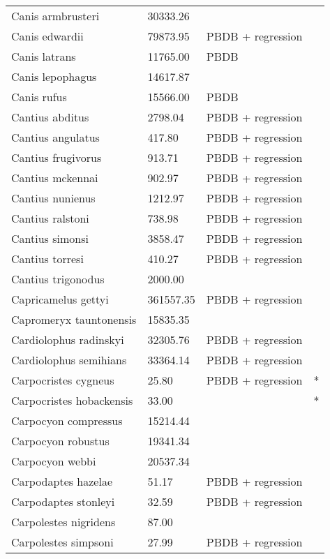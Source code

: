 \documentclass{article}
\begin{document}
\begin{center}
\begin{longtable}{p{} p{} p{} p{}}
    Canis armbrusteri & 30333.26 & \cite{Tomiya2013} &  \\ 
    Canis edwardii & 79873.95 & PBDB + regression &  \\ 
    Canis latrans & 11765.00 & PBDB &  \\ 
    Canis lepophagus & 14617.87 & \cite{Tomiya2013} &  \\ 
    Canis rufus & 15566.00 & PBDB &  \\ 
    Cantius abditus & 2798.04 & PBDB + regression &  \\ 
    Cantius angulatus & 417.80 & PBDB + regression &  \\ 
    Cantius frugivorus & 913.71 & PBDB + regression &  \\ 
    Cantius mckennai & 902.97 & PBDB + regression &  \\ 
    Cantius nunienus & 1212.97 & PBDB + regression &  \\ 
    Cantius ralstoni & 738.98 & PBDB + regression &  \\ 
    Cantius simonsi & 3858.47 & PBDB + regression &  \\ 
    Cantius torresi & 410.27 & PBDB + regression &  \\ 
    Cantius trigonodus & 2000.00 & \cite{Soligo2006} &  \\ 
    Capricamelus gettyi & 361557.35 & PBDB + regression &  \\ 
    Capromeryx tauntonensis & 15835.35 & \cite{Tomiya2013} &  \\ 
    Cardiolophus radinskyi & 32305.76 & PBDB + regression &  \\ 
    Cardiolophus semihians & 33364.14 & PBDB + regression &  \\ 
    Carpocristes cygneus & 25.80 & PBDB + regression & * \\ 
    Carpocristes hobackensis & 33.00 & \cite{Soligo2006} & * \\ 
    Carpocyon compressus & 15214.44 & \cite{Tomiya2013} &  \\ 
    Carpocyon robustus & 19341.34 & \cite{Tomiya2013} &  \\ 
    Carpocyon webbi & 20537.34 & \cite{Tomiya2013} &  \\ 
    Carpodaptes hazelae & 51.17 & PBDB + regression &  \\ 
    Carpodaptes stonleyi & 32.59 & PBDB + regression &  \\ 
    Carpolestes nigridens & 87.00 & \cite{Scott2003a} &  \\ 
    Carpolestes simpsoni & 27.99 & PBDB + regression &  \\ 

\end{longtable}
\end{center}
\end{document}
